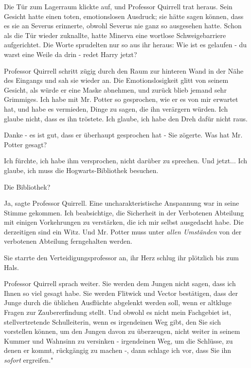 Die Tür zum Lagerraum klickte auf, und Professor Quirrell trat heraus. Sein
Gesicht hatte einen toten, emotionslosen Ausdruck; sie hätte sagen können, dass
es sie an Severus erinnerte, obwohl Severus nie ganz so ausgesehen hatte. Schon
als die Tür wieder zuknallte, hatte Minerva eine wortlose Schweigebarriere
aufgerichtet. Die Worte sprudelten nur so aus ihr heraus: \glqq Wie ist es
gelaufen - du warst eine Weile da drin - redet Harry jetzt?\grqq{}

Professor Quirrell schritt zügig durch den Raum zur hinteren Wand in der Nähe
des Eingangs und sah sie wieder an. Die Emotionslosigkeit glitt von seinem
Gesicht, als würde er eine Maske abnehmen, und zurück blieb jemand sehr
Grimmiges. \glqq Ich habe mit Mr. Potter so gesprochen, wie er es von mir
erwartet hat, und habe es vermieden, Dinge zu sagen, die ihn verärgern würden.
Ich glaube nicht, dass es ihn tröstete. Ich glaube, ich habe den Dreh dafür
nicht raus.\grqq{}

\glqq Danke - es ist gut, dass er überhaupt gesprochen hat -\grqq{} Sie zögerte.
\glqq Was hat Mr. Potter gesagt?\grqq{}

\glqq Ich fürchte, ich habe ihm versprochen, nicht darüber zu sprechen. Und
jetzt... Ich glaube, ich muss die Hogwarts-Bibliothek besuchen.\grqq{}

\glqq Die Bibliothek?\grqq{}

\glqq Ja\grqq{}, sagte Professor Quirrell. Eine uncharakteristische Anspannung
war in seine Stimme gekommen. \glqq Ich beabsichtige, die Sicherheit in der
Verbotenen Abteilung mit einigen Vorkehrungen zu verstärken, die ich mir selbst
ausgedacht habe. Die derzeitigen sind ein Witz. Und Mr. Potter muss unter
\emph{allen Umständen} von der verbotenen Abteilung ferngehalten werden.\grqq{}

Sie starrte den Verteidigungsprofessor an, ihr Herz schlug ihr plötzlich bis zum
Hals.

Professor Quirrell sprach weiter. \glqq Sie werden dem Jungen nicht sagen, dass
ich Ihnen so viel gesagt habe. Sie werden Flitwick und Vector bestätigen, dass
der Junge durch die üblichen Ausflüchte abgelenkt werden soll, wenn er altkluge
Fragen zur Zaubererfindung stellt. Und obwohl es nicht mein Fachgebiet ist,
stellvertretende Schulleiterin, wenn es irgendeinen Weg gibt, den Sie sich
vorstellen können, um den Jungen davon zu überzeugen, nicht weiter in seinem
Kummer und Wahnsinn zu versinken - irgendeinen Weg, um die Schlüsse, zu denen er
kommt, rückgängig zu machen -, dann schlage ich vor, dass Sie ihn \emph{sofort}
ergreifen."

